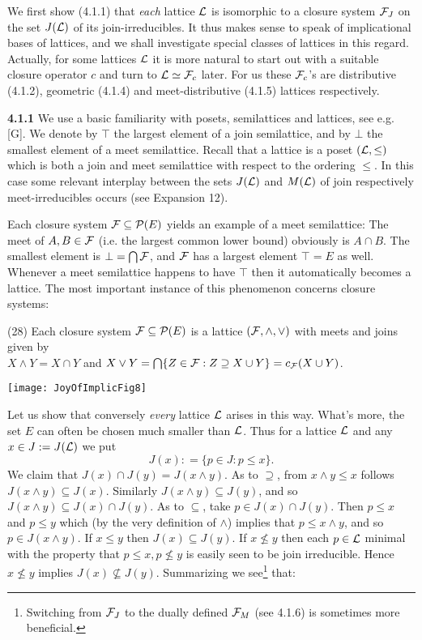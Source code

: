 \documentclass[11pt]{article}
\begin{document}
We first show (4.1.1) that {\it each} lattice ${\cal L}$ is isomorphic to a closure system ${\cal F}_J$ on the set $J({\cal L})$ of its join-irreducibles. It thus makes sense to speak of implicational bases of lattices, and we shall investigate special classes of lattices in this regard. Actually, for some lattices ${\cal L}$ it is more natural to start out with a suitable closure operator $c$ and turn to ${\cal L} \simeq {\cal F}_c$ later. For us these ${\cal F}_c$'s are distributive (4.1.2), geometric (4.1.4) and meet-distributive (4.1.5) lattices respectively.

 
{\bf 4.1.1} We use a basic familiarity with posets, semilattices and lattices, see e.g. [G]. We denote by $\top$ the largest element of a join semilattice, and by $\bot$ the smallest element of a meet semilattice. Recall that a lattice is a poset $({\cal L}, \leq)$ which is both a join and meet semilattice with respect to the ordering $\leq$. In this case some relevant interplay between the sets $J({\cal L})$ and $M({\cal L})$ of join respectively meet-irreducibles occurs (see Expansion 12).

Each closure system ${\cal F} \subseteq {\cal P}(E)$ yields an example of a meet semilattice: The meet of $A, B \in {\cal F}$ (i.e. the largest common lower bound) obviously is $A \cap B$. The smallest element is $\bot = \bigcap {\cal F}$, and ${\cal F}$ has a largest element $\top = E$ as well. Whenever a meet semilattice  happens to have $\top$ then it automatically becomes a lattice. The most important instance of this phenomenon concerns closure systems:

(28) \quad Each closure system ${\cal F} \subseteq {\cal P}(E)$ is a lattice $({\cal F}, \wedge, \vee)$ with meets and joins given by\\
\hspace*{1cm} $X \wedge Y = X \cap Y$ and $X \vee Y = \bigcap \{Z \in {\cal F}: Z \supseteq X \cup Y\}=c_{\cal F} (X \cup Y)$.


\begin{center}
\texttt{[image: JoyOfImplicFig8]}
\end{center}


Let us show that conversely {\it every} lattice ${\cal L}$ arises in this way. What's more, the set $E$ can often be chosen much smaller than ${\cal L}$. Thus for a lattice ${\cal L}$ and any $x \in J := J({\cal L})$ we put
$$J(x) : = \{p\in J : p \leq x\}.$$
We claim that $J(x) \cap J(y) = J(x \wedge y)$. As to $\supseteq$, from $x \wedge y \leq x$ follows $J(x \wedge y) \subseteq J(x)$. Similarly $J(x \wedge y) \subseteq J(y)$, and so $J(x \wedge y) \subseteq J(x) \cap J(y)$. As to $\subseteq$, take $p \in J(x) \cap J(y)$. Then $p \leq x$ and $p \leq y$ which (by the very definition of $\wedge$) implies that $p \leq x \wedge y$, and so $p \in J(x \wedge y)$. If $x \leq y$ then $J(x) \subseteq J(y)$. If $x \not\leq y$ then each $p \in {\cal L}$ minimal with the property that $p \leq x, p \not\leq y$ is easily seen to be join irreducible. Hence $x \not\leq y$ implies $J(x) \not\subseteq J(y)$. Summarizing we see\footnote{Switching from ${\cal F}_J$ to the dually defined ${\cal F}_M$ (see 4.1.6) is sometimes more beneficial.} that:
\end{document}
